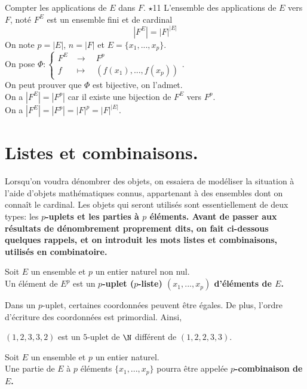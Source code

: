 \documentclass[11pt]{article}
\begin{document}
\begin{prop}{Compter les applications de $E$ dans $F$. $\star$}{11}
    L'ensemble des applications de $E$ vers $F$, noté $F^E$ est un ensemble fini et de cardinal
    \begin{equation*}
        |F^E|=|F|^{|E|}
    \end{equation*}
    \tcblower
    On note $p=|E|$, $n=|F|$ et $E=\{x_1,...,x_p\}$.\\
    On pose $\Phi:\begin{cases}
        F^E&\to\quad F^{p}\\
        f&\mapsto\quad(f(x_1),...,f(x_p))
    \end{cases}$.\\
    On peut prouver que $\Phi$ est bijective, on l'admet.\\
    On a $|F^E|=|F^p|$ car il existe une bijection de $F^E$ vers $F^p$.\\
    On a $|F^E|=|F^p|=|F|^p=|F|^{|E|}$.
\end{prop}

\section{Listes et combinaisons.}
\indent Lorsqu'on voudra dénombrer des objets, on essaiera de modéliser la situation à l'aide d'objets mathématiques connus, appartenant à des ensembles dont on connaît le cardinal. Les objets qui seront utilisés sont essentiellement de deux types: les \bf{$p$-uplets} et les \bf{parties à $p$ éléments}. Avant de passer aux résultats de dénombrement proprement dits, on fait ci-dessous quelques rappels, et on introduit les mots \bf{listes} et \bf{combinaisons}, utilisés en combinatoire.

\begin{defi}{}{}
    Soit $E$ un ensemble et $p$ un entier naturel non nul.\\
    Un élément de $E^p$ est un \bf{$p$-uplet} ($p$-liste) $(x_1,...,x_p)$ d'éléments de $E$.
\end{defi}

Dans un $p$-uplet, certaines coordonnées peuvent être égales. De plus, l'ordre d'écriture des coordonnées est primordial. Ainsi,
\begin{center}
    $(1,2,3,3,2)$ est un $5$-uplet de $\N$ différent de $(1,2,2,3,3)$.
\end{center}

\begin{defi}{}{}
    Soit $E$ un ensemble et $p$ un entier naturel.\\
    Une partie de $E$ à $p$ éléments $\{x_1,...,x_p\}$ pourra être appelée \bf{$p$-combinaison} de $E$.
\end{defi}
\end{document}
